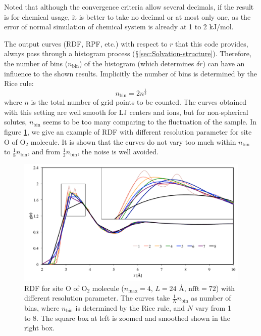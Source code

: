 Noted that although the convergence criteria allow several decimals,
if the result is for chemical usage, it is better to take no decimal
or at most only one, as the error of normal simulation of chemical
system is already at 1 to 2 $\mathrm{kJ/mol}$.

The output curves (\acs{RDF}, \acs{RPF}, etc.) with respect to $r$
that this code provides, always pass through a histogram process ($\mathsection$\ref{sec:Solvation-structure}).
Therefore, the number of bins ($n_{\mathrm{bin}}$) of the histogram
(which determines $\delta r$) can have an influence to the shown
results. Implicitly the number of bins is determined by the Rice rule:
\begin{equation}
n_{\mathrm{bin}}=2n^{\frac{1}{3}}
\end{equation}
where $n$ is the total number of grid points to be counted. The curves
obtained with this setting are well smooth for LJ centers and ions,
but for non-spherical solutes, $n_{\mathrm{bin}}$ seems to be too
many comparing to the fluctuation of the sample. In figure \ref{fig:rdf-with-different},
we give an example of \acs{RDF} with different resolution parameter
for site O of $\mathrm{O_{2}}$ molecule. It is shown that the curves
do not vary too much within $n_{\mathrm{bin}}$ to $\frac{1}{8}n_{\mathrm{bin}}$,
and from $\frac{1}{3}n_{\mathrm{bin}}$, the noise is well avoided.

\begin{figure}[h]
\begin{centering}
\includegraphics[bb=0cm 0.6cm 33cm 18cm,width=1\columnwidth]{_figure/results/rdf-smoothing}
\par\end{centering}
\caption[\acs{RDF} with different resolution parameter]{\acs{RDF} for site O of $\mathrm{O_{2}}$ molecule ($n_{\max}=4$,
$L=24$ $\textrm{Å}$, $\mathrm{nfft}=72$) with different resolution
parameter. The curves take $\frac{1}{N}n_{\mathrm{bin}}$ as number
of bins, where $n_{\mathrm{bin}}$ is determined by the Rice rule,
and $N$ vary from 1 to 8. The square box at left is zoomed and smoothed
shown in the right box.\label{fig:rdf-with-different}}
\end{figure}


